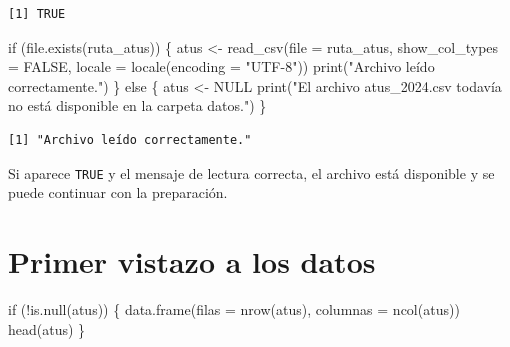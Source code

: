 \documentclass[
  spanish,
  11pt,
  letterpaper,
]{book}
\newenvironment{Shaded}{}{}
\newcommand{\AttributeTok}[1]{\textcolor[rgb]{0.84,0.23,0.29}{#1}}
\newcommand{\ConstantTok}[1]{\textcolor[rgb]{0.00,0.36,0.77}{#1}}
\newcommand{\ControlFlowTok}[1]{\textcolor[rgb]{0.84,0.23,0.29}{#1}}
\newcommand{\FunctionTok}[1]{\textcolor[rgb]{0.44,0.26,0.76}{#1}}
\newcommand{\NormalTok}[1]{\textcolor[rgb]{0.14,0.16,0.18}{#1}}
\newcommand{\OtherTok}[1]{\textcolor[rgb]{0.44,0.26,0.76}{#1}}
\newcommand{\SpecialCharTok}[1]{\textcolor[rgb]{0.00,0.36,0.77}{#1}}
\newcommand{\StringTok}[1]{\textcolor[rgb]{0.01,0.18,0.38}{#1}}
\begin{document}
\begin{verbatim}
[1] TRUE
\end{verbatim}

\begin{Shaded}
\begin{Highlighting}[]
\ControlFlowTok{if}\NormalTok{ (}\FunctionTok{file.exists}\NormalTok{(ruta\_atus)) \{}
\NormalTok{  atus }\OtherTok{\textless{}{-}} \FunctionTok{read\_csv}\NormalTok{(}\AttributeTok{file =}\NormalTok{ ruta\_atus, }\AttributeTok{show\_col\_types =} \ConstantTok{FALSE}\NormalTok{, }\AttributeTok{locale =} \FunctionTok{locale}\NormalTok{(}\AttributeTok{encoding =} \StringTok{"UTF{-}8"}\NormalTok{))}
  \FunctionTok{print}\NormalTok{(}\StringTok{"Archivo leído correctamente."}\NormalTok{)}
\NormalTok{\} }\ControlFlowTok{else}\NormalTok{ \{}
\NormalTok{  atus }\OtherTok{\textless{}{-}} \ConstantTok{NULL}
  \FunctionTok{print}\NormalTok{(}\StringTok{"El archivo atus\_2024.csv todavía no está disponible en la carpeta datos."}\NormalTok{)}
\NormalTok{\}}
\end{Highlighting}
\end{Shaded}

\begin{verbatim}
[1] "Archivo leído correctamente."
\end{verbatim}

\begin{tcolorbox}[enhanced jigsaw, arc=.35mm, bottomrule=.15mm, bottomtitle=1mm, breakable, colback=white, colbacktitle=quarto-callout-tip-color!10!white, colframe=quarto-callout-tip-color-frame, coltitle=black, left=2mm, leftrule=.75mm, opacityback=0, opacitybacktitle=0.6, rightrule=.15mm, title=\textcolor{quarto-callout-tip-color}{\faLightbulb}\hspace{0.5em}{Interpretación del resultado}, titlerule=0mm, toprule=.15mm, toptitle=1mm]

Si aparece \texttt{TRUE} y el mensaje de lectura correcta, el archivo
está disponible y se puede continuar con la preparación.

\end{tcolorbox}

\section{Primer vistazo a los datos}\label{primer-vistazo-a-los-datos}

\begin{Shaded}
\begin{Highlighting}[]
\ControlFlowTok{if}\NormalTok{ (}\SpecialCharTok{!}\FunctionTok{is.null}\NormalTok{(atus)) \{}
  \FunctionTok{data.frame}\NormalTok{(}\AttributeTok{filas =} \FunctionTok{nrow}\NormalTok{(atus), }\AttributeTok{columnas =} \FunctionTok{ncol}\NormalTok{(atus))}
  \FunctionTok{head}\NormalTok{(atus)}
\NormalTok{\}}
\end{Highlighting}
\end{Shaded}
\end{document}
